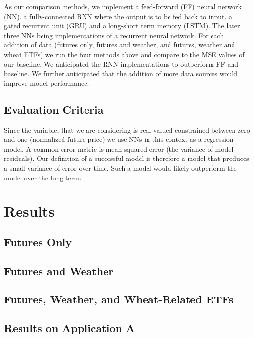 \documentclass[twoside,11pt]{article}
\begin{document}
As our comparison methods, we implement a feed-forward (FF) neural network (NN), a fully-connected RNN where the output is to be fed back to input, a gated recurrent unit (GRU) and a long-short term memory (LSTM). The later three NNs being implementations of a recurrent neural network. For each addition of data (futures only, futures and weather, and futures, weather and wheat ETFs) we run the four methods above and compare to the MSE values of our baseline. We anticipated the RNN implementations to outperform FF and baseline. We further anticipated that the addition of more data sources would improve model performance. 

\subsection{Evaluation Criteria}

Since the variable, that we are considering is real valued constrained between zero and one (normalized future price) we use NNs in this context as a regression model. A common error metric is mean squared error (the variance of model residuals). Our definition of a successful model is therefore a model that produces a small variance of error over time. Such a model would likely outperform the model over the long-term. 

\section{Results} \label{results}

\subsection{Futures Only}



\subsection{Futures and Weather}

\subsection{Futures, Weather, and Wheat-Related ETFs}

\subsection{Results on Application A}
\end{document}
